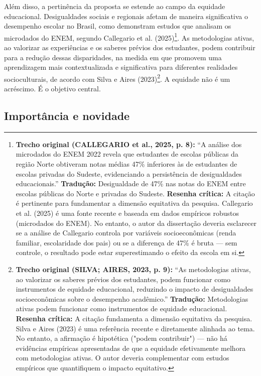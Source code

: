 Além disso, a pertinência da proposta se estende ao campo da equidade educacional. Desigualdades sociais e regionais afetam de maneira significativa o desempenho escolar no Brasil, como demonstram estudos que analisam os microdados do ENEM, segundo Callegario et al. (2025)\footnote{\textbf{Trecho original (CALLEGARIO et al., 2025, p. 8):} ``A análise dos microdados do ENEM 2022 revela que estudantes de escolas públicas da região Norte obtiveram notas médias 47\% inferiores às de estudantes de escolas privadas do Sudeste, evidenciando a persistência de desigualdades educacionais.'' \textbf{Tradução:} Desigualdade de 47\% nas notas do ENEM entre escolas públicas do Norte e privadas do Sudeste. \textbf{Resenha crítica:} A citação é pertinente para fundamentar a dimensão equitativa da pesquisa. Callegario et al. (2025) é uma fonte recente e baseada em dados empíricos robustos (microdados do ENEM). No entanto, o autor da dissertação deveria esclarecer se a análise de Callegario controla por variáveis socioeconômicas (renda familiar, escolaridade dos pais) ou se a diferença de 47\% é bruta — sem controle, o resultado pode estar superestimando o efeito da escola em si.}. As metodologias ativas, ao valorizar as experiências e os saberes prévios dos estudantes, podem contribuir para a redução dessas disparidades, na medida em que promovem uma aprendizagem mais contextualizada e significativa para diferentes realidades socioculturais, de acordo com Silva e Aires (2023)\footnote{\textbf{Trecho original (SILVA; AIRES, 2023, p. 9):} ``As metodologias ativas, ao valorizar os saberes prévios dos estudantes, podem funcionar como instrumentos de equidade educacional, reduzindo o impacto de desigualdades socioeconômicas sobre o desempenho acadêmico.'' \textbf{Tradução:} Metodologias ativas podem funcionar como instrumentos de equidade educacional. \textbf{Resenha crítica:} A citação fundamenta a dimensão equitativa da pesquisa. Silva e Aires (2023) é uma referência recente e diretamente alinhada ao tema. No entanto, a afirmação é hipotética ("podem contribuir") — não há evidências empíricas apresentadas de que a equidade efetivamente melhora com metodologias ativas. O autor deveria complementar com estudos empíricos que quantifiquem o impacto equitativo.}. A equidade não é um acréscimo. É o objetivo central.

\subsection{Importância e novidade}
\label{subsec:jg_importancia}

